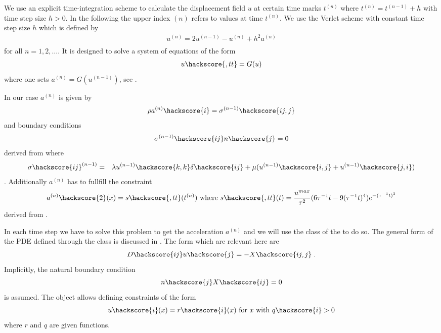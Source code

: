 We use an explicit time-integration scheme to calculate the displacement field $u$ at 
certain time marks $t^{(n)}$ where $t^{(n)}=t^{(n-1)}+h$ with time step size $h>0$. In the following the upper index ${(n)}$ refers to values at time $t^{(n)}$. We use the Verlet scheme  with constant time step size $h$
which is defined by
\begin{eqnarray} \label{WAVE dyn 2}
u^{(n)}=2u^{(n-1)}-u^{(n)} + h^2 a^{(n)} \\
\end{eqnarray}
for all $n=1,2,\ldots$. It is designed to solve a system of equations of the form
\begin{eqnarray} \label{WAVE dyn 2b} 
u\hackscore{,tt}=G(u)
\end{eqnarray}
where one sets $a^{(n)}=G(u^{(n-1)})$, see . 

In our case $a^{(n)}$ is given by
\begin{eqnarray}\label{WAVE dyn 3}
\rho a^{(n)}\hackscore{i}=\sigma^{(n-1)}\hackscore{ij,j}
\end{eqnarray}
and boundary conditions
\begin{eqnarray} \label{WAVE natural}
\sigma^{(n-1)}\hackscore{ij}n\hackscore{j}=0
\end{eqnarray}
derived from  where 
\begin{eqnarray} \label{WAVE dyn 3a}
\sigma\hackscore{ij}^{(n-1)} & = & \lambda u^{(n-1)}\hackscore{k,k} \delta\hackscore{ij} + \mu ( u^{(n-1)}\hackscore{i,j} + u^{(n-1)}\hackscore{j,i})
\end{eqnarray}.
Additionally $a^{(n)}$ has to fullfill the constraint
\begin{eqnarray}\label{WAVE dyn 4}
a^{(n)}\hackscore{2}(x)= s\hackscore{,tt}(t^{(n)})\mbox{ where } s\hackscore{,tt}(t)=\frac{u^{max}}{\tau^2}
(6\tau^{-1}t- 9(\tau^{-1}t)^4) e^{-(\tau^{-1}t)^3}  
\end{eqnarray}
derived from . 


In each time step we have to solve this problem to get the acceleration $a^{(n)}$ and we will
use the \LinearPDE class of the \linearPDEsPack to do so. The general form of the PDE defined through
the \LinearPDE class is discussed in . The form which are relevant here are  
\begin{equation}\label{WAVE dyn 100}
D\hackscore{ij} u\hackscore{j} = - X\hackscore{ij,j}\; .
\end{equation}
Implicitly, the natural boundary condition
\begin{equation}\label{WAVE dyn 101}
n\hackscore{j}X\hackscore{ij} =0 
\end{equation}
is assumed. The \LinearPDE object allows defining constraints of the form
\begin{equation}\label{WAVE dyn 101}
u\hackscore{i}(x)=r\hackscore{i}(x) \mbox{ for } x \mbox{ with } q\hackscore{i}>0
\end{equation}
where $r$ and $q$ are given functions.

